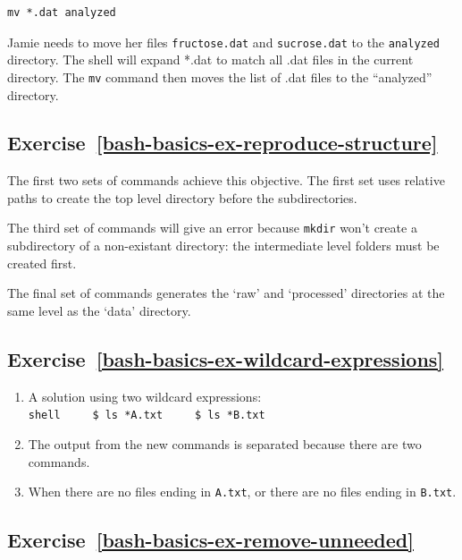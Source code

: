 \documentclass[
]{krantz}
\providecommand{\tightlist}{%
  \setlength{\itemsep}{0pt}\setlength{\parskip}{0pt}}
\begin{document}
\begin{verbatim}
mv *.dat analyzed
\end{verbatim}

Jamie needs to move her files \texttt{fructose.dat} and \texttt{sucrose.dat} to the \texttt{analyzed} directory.
The shell will expand *.dat to match all .dat files in the current directory.
The \texttt{mv} command then moves the list of .dat files to the ``analyzed'' directory.

\hypertarget{exercise-refbash-basics-ex-reproduce-structure}{%
\subsection*{Exercise~\ref{bash-basics-ex-reproduce-structure}}\label{exercise-refbash-basics-ex-reproduce-structure}}


The first two sets of commands achieve this objective.
The first set uses relative paths to create the top level directory before
the subdirectories.

The third set of commands will give an error because \texttt{mkdir} won't create a subdirectory
of a non-existant directory: the intermediate level folders must be created first.

The final set of commands generates the `raw' and `processed' directories at the same level
as the `data' directory.

\hypertarget{exercise-refbash-basics-ex-wildcard-expressions}{%
\subsection*{Exercise~\ref{bash-basics-ex-wildcard-expressions}}\label{exercise-refbash-basics-ex-wildcard-expressions}}


\begin{enumerate}
\def\labelenumi{\arabic{enumi}.}
\tightlist
\item
  A solution using two wildcard expressions:
  \texttt{shell\ \ \ \ \ \$\ ls\ *A.txt\ \ \ \ \ \$\ ls\ *B.txt}
\item
  The output from the new commands is separated because there are two commands.
\item
  When there are no files ending in \texttt{A.txt}, or there are no files ending in
  \texttt{B.txt}.
\end{enumerate}

\hypertarget{exercise-refbash-basics-ex-remove-unneeded}{%
\subsection*{Exercise~\ref{bash-basics-ex-remove-unneeded}}\label{exercise-refbash-basics-ex-remove-unneeded}}
\end{document}
